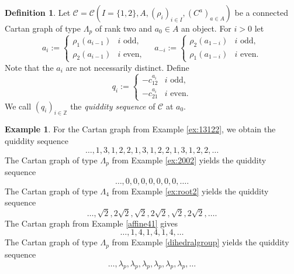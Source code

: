 \documentclass[11pt,a4paper]{amsart}
\theoremstyle{definition}
\newtheorem{Definition}[Lemma]{Definition}
\newtheorem{Example}[Lemma]{Example}
\numberwithin{equation}{section}
\newcommand{\rfl }{\rho }
\newcommand{\Cc }{\mathcal{C}}
\newcommand{\cm }{c}
\newcommand{\qs}{q}
\begin{document}
\begin{Definition} \label{def:quiddity}
Let $\Cc=\Cc (I=\{1,2\},A,(\rfl _i)_{i\in I},(C^a)_{a\in A})$ be a connected Cartan graph of type $\Lambda_p$ of rank two and $a_0\in A$ an object.
For $i>0$ let
$$ a_i := \begin{cases}
\rfl_1 (a_{i-1}) & i \text{ odd},\\
\rfl_2 (a_{i-1}) & i \text{ even},
\end{cases}
\quad
a_{-i} := \begin{cases}
\rfl_2 (a_{1-i}) & i \text{ odd},\\
\rfl_1 (a_{1-i}) & i \text{ even}.
\end{cases}
$$
Note that the $a_i$ are not necessarily distinct.
Define
$$
\qs_i :=
\begin{cases}
-\cm^{a_i}_{12} & i \text{ odd}, \\
-\cm^{a_i}_{21} & i \text{ even}.
\end{cases}
$$
We call $(q_i)_{i\in\mathbb{Z}}$ the \emph{quiddity sequence} of $\Cc$ at $a_0$.
\end{Definition}


\begin{Example}
For the Cartan graph from Example \ref{ex:13122}, we obtain the quiddity sequence
$$
\ldots,1,3,1,2,2,1,3,1,2,2,1,3,1,2,2,\ldots
$$
The Cartan graph of type $\Lambda_p$
from Example \ref{ex:2002} yields the 
quiddity sequence
$$\ldots,0,0,0,0,0,0,0,\ldots.
$$
The Cartan graph of type $\Lambda_4$
from Example \ref{ex:root2} yields the 
quiddity sequence
$$\ldots,\sqrt{2},2\sqrt{2},\sqrt{2},
2\sqrt{2},\sqrt{2},2\sqrt{2},\ldots.
$$
The Cartan graph from Example \ref{affine41} gives
$$
\ldots,1,4,1,4,1,4,\ldots
$$
The Cartan graph of type $\Lambda_p$ 
from Example \ref{dihedralgroup} yields 
the quiddity sequence
$$\ldots, \lambda_p,\lambda_p,
\lambda_p,\lambda_p,\lambda_p,\lambda_p,
\ldots
$$
\end{Example}
\end{document}
